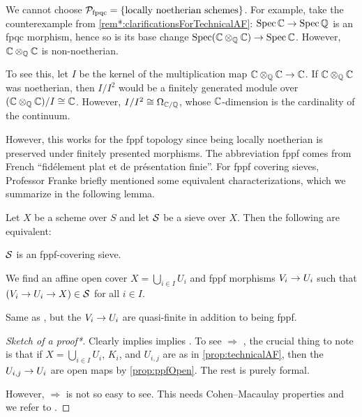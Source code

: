 \documentclass[a4paper, 10pt, oneside, DIV=9, chapterprefix=true, numbers=enddot, bibliography=totoc]{scrbook}
\begin{document}
\begin{rem}
	\begin{alphanumerate}
		\item We cannot choose $\mathcal{P}_{\mathrm{fpqc}}=\left\{\text{locally noetherian schemes}\right\}$. For example, take the counterexample from \cref{rem*:clarificationsForTechnicalAF}: $\Spec\IC\morphism \Spec\IQ$ is an fpqc morphism, hence so is its base change $\Spec(\IC\otimes_\IQ\IC)\morphism \Spec\IC$. However, $\mathbb{C}\otimes_{\mathbb{Q}}\mathbb{C}$ is non-noetherian. 
		
		To see this, let $I$ be the kernel of the multiplication map $\IC\otimes_\IQ\IC\morphism \IC$. If $\mathbb{C}\otimes_{\mathbb{Q}}\mathbb{C}$ was noetherian, then $I/I^2$ would be a finitely generated module over $(\mathbb{C}\otimes_{\mathbb{Q}}\mathbb{C})/I\cong \mathbb{C}$. However, $I/I^2\cong \Omega_{\mathbb{C}/\mathbb{Q}}$, whose $\mathbb{C}$-dimension is the cardinality of the continuum.
		\item However, this works for the fppf topology since being locally noetherian is preserved under finitely presented morphisms. The abbreviation fppf comes from French \enquote{fidélement plat et de présentation finie}. For fppf covering sieves, Professor Franke briefly mentioned some equivalent characterizations, which we summarize in the following lemma. 
	\end{alphanumerate}
\end{rem}
\begin{lem*}\label{lem*:fppf}
	Let $X$ be a scheme over $S$ and let $\mathcal{S}$ be a sieve over $X$. Then the following are equivalent:
	\begin{alphanumerate}
		\item $\mathcal{S}$ is an fppf-covering sieve.
		\item We find an affine open cover $X=\bigcup_{i\in I}U_i$ and fppf morphisms $V_i\morphism U_i$ such that $(V_i\morphism U_i\morphism X)\in \Ss$ for all $i\in I$.
		\item Same as , but the $V_i\morphism U_i$ are quasi-finite in addition to being fppf.
	\end{alphanumerate}
\end{lem*}
\begin{proof}[Sketch of a proof\textup{*}]
	Clearly  implies  implies . To see  $\Rightarrow$ , the crucial thing to note is that if $X=\bigcup_{i\in I}U_i$, $K_i$, and $U_{i,j}$ are as in \cref{prop:technicalAF}, then the $U_{i,j}\morphism U_i$ are open maps by \cref{prop:ppfOpen}. The rest is purely formal.
	
	However,  $\Rightarrow$  is not so easy to see. This needs Cohen--Macaulay properties and we refer to \cite[]{stacks-project}.
\end{proof}
\end{document}
